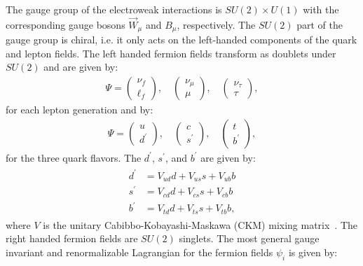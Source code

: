 The gauge group of the electroweak interactions is $SU(2) \times U(1)$ with the corresponding gauge bosons $\vec{W}_{\mu}$ and $B_{\mu}$, respectively. The $SU(2)$ part of the gauge group is chiral, i.e. it only acts on the left-handed components of the quark and lepton fields. The left handed fermion fields transform as doublets under $SU(2)$ and are given by:
\begin{eqnarray} \label{eq:doublet}
\Psi  = \left(\begin{array}{c} \nu_{f}\\ \ell_{f} \end{array} \right)\mathrm{,}  \quad \left(\begin{array}{c} \nu_{\mu}\\ \mu \end{array} \right)\mathrm{,}   \quad \left(\begin{array}{c} \nu_{\tau}\\ \tau \end{array} \right),
\end{eqnarray}   
for each lepton generation and by:
\begin{eqnarray} \label{eq:doublet_quark}
\Psi  = \left(\begin{array}{c} u \\ d^{'} \end{array} \right)\mathrm{,}  \quad \left(\begin{array}{c} c\\ s^{'} \end{array} \right)\mathrm{,}   \quad \left(\begin{array}{c} t\\ b^{'} \end{array} \right),
\end{eqnarray}   
for the three quark flavors. The $d^{'}$, $s^{'}$, and $b^{'}$ are given by:
\begin{eqnarray} \label{eq:ckm}
\begin{aligned}
d^{'} &= V_{ud}d + V_{us}s + V_{ub}b \\
s^{'} &= V_{cd}d + V_{cs}s + V_{cb}b \\
b^{'} &= V_{td}d + V_{ts}s + V_{tb}b, 
\end{aligned}
\end{eqnarray}   
where $V$ is the unitary Cabibbo-Kobayashi-Maskawa (CKM) mixing matrix~\cite{Cabibbo:1963yz,Kobayashi:1973fv}. The right handed fermion fields are $SU(2)$ singlets. The most general gauge invariant and renormalizable Lagrangian for the fermion fields $\psi_{i}$ is given by:
